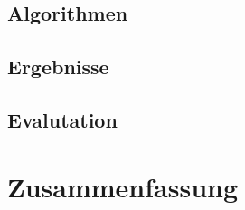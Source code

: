 \documentclass[a4paper,listof=totoc,abstracton]{scrreprt}
\begin{document}
\section{Algorithmen}
\section{Ergebnisse}
\section{Evalutation}

\chapter{Zusammenfassung}

\nocite{*}


\clearpage
{}

\end{document}
